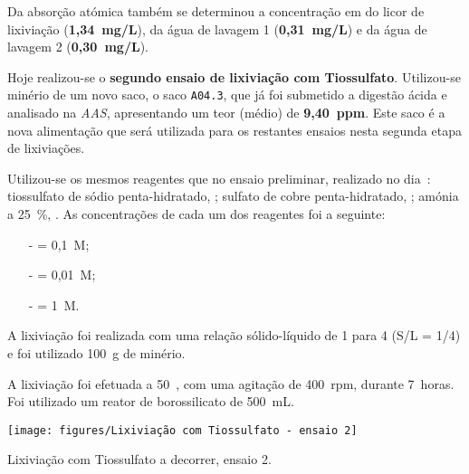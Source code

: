 Da absorção atómica também se determinou a concentração em  do licor de lixiviação (\textbf{1,34~mg/L}), da água de lavagem 1 (\textbf{0,31~mg/L}) e da água de lavagem 2 (\textbf{0,30~mg/L}).

\hrulefill

\label{day:9-janeiro-2025}

Hoje realizou-se o \textbf{segundo ensaio de lixiviação com Tiossulfato}.
Utilizou-se minério de um novo saco, o saco \texttt{A04.3}, que já foi submetido a digestão ácida e analisado na \emph{AAS}, apresentando um teor (médio) de \textbf{9,40~ppm}.
Este saco é a nova alimentação que será utilizada para os restantes ensaios nesta segunda etapa de lixiviações.


Utilizou-se os mesmos reagentes que no ensaio preliminar, realizado no dia~: tiossulfato de sódio penta-hidratado, \tsp{}; sulfato de cobre penta-hidratado, \sulfcu{}; amónia a 25~\%, \amo{}.
As concentrações de cada um dos reagentes foi a seguinte:

\begin{itemize}
	\item[-] \tsp{} = 0,1~M;
	\item[-] \sulfcu{} = 0,01~M;
	\item[-] \amo{} = 1~M.
\end{itemize}

A lixiviação foi realizada com uma relação sólido-líquido de 1 para 4 (S/L = 1/4) e foi utilizado 100~g de minério.

A lixiviação foi efetuada a 50~\graus{}, com uma agitação de 400~rpm, durante 7~horas.
Foi utilizado um reator de borossilicato de 500~mL.

\begin{marginfigure}[2cm]
	\centering
	\texttt{[image: figures/Lixiviação com Tiossulfato - ensaio 2]}
	\caption{Lixiviação com Tiossulfato a decorrer, ensaio 2.}
	\label{fig:lix-tiossulfato2}
\end{marginfigure}

